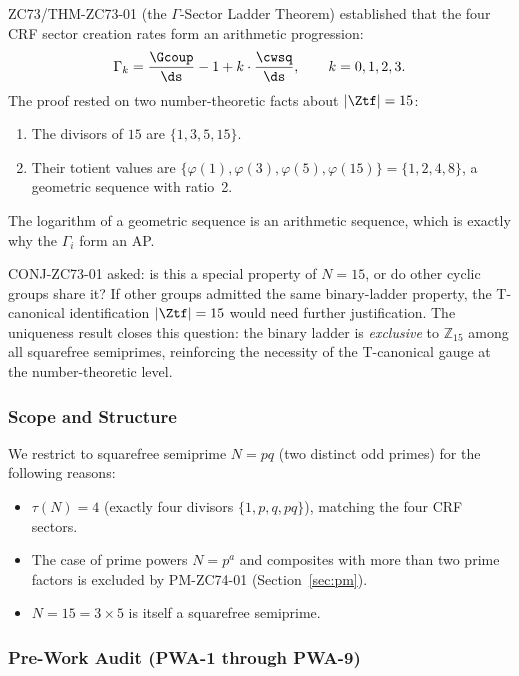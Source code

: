 \documentclass[12pt, a4paper]{article}
\begin{document}
\begin{keybox}[title={What CONJ-ZC73-01 Requires and Why It Matters}]
ZC73/THM-ZC73-01 (the $\Gamma$-Sector Ladder Theorem) established that
the four CRF sector creation rates form an arithmetic progression:
\[
  \Gamma_k = \frac{\Gcoup}{\ds} - 1 + k\cdot\frac{\cwsq}{\ds},
  \qquad k = 0, 1, 2, 3.
\]
The proof rested on two number-theoretic facts about $|\Ztf| = 15$:
\begin{enumerate}[leftmargin=2em, noitemsep]
  \item The divisors of $15$ are $\{1, 3, 5, 15\}$.
  \item Their totient values are $\{\varphi(1), \varphi(3), \varphi(5),
    \varphi(15)\} = \{1, 2, 4, 8\}$, a geometric sequence with ratio~2.
\end{enumerate}
The logarithm of a geometric sequence is an arithmetic sequence,
which is exactly why the $\Gamma_i$ form an AP.

CONJ-ZC73-01 asked: is this a special property of $N = 15$, or do
other cyclic groups share it? If other groups admitted the same
binary-ladder property, the T-canonical identification
$|\Ztf| = 15$ would need further justification. The uniqueness
result closes this question: the binary ladder is \emph{exclusive}
to $\mathbb{Z}_{15}$ among all squarefree semiprimes, reinforcing
the necessity of the T-canonical gauge at the number-theoretic level.
\end{keybox}

\subsubsection{Scope and Structure}

We restrict to squarefree semiprime $N = pq$ (two distinct odd primes)
for the following reasons:
\begin{itemize}[leftmargin=2em, noitemsep]
  \item $\tau(N) = 4$ (exactly four divisors $\{1, p, q, pq\}$),
    matching the four CRF sectors.
  \item The case of prime powers $N = p^a$ and composites with more
    than two prime factors is excluded by PM-ZC74-01
    (Section~\ref{sec:pm}).
  \item $N = 15 = 3 \times 5$ is itself a squarefree semiprime.
\end{itemize}

\subsubsection{Pre-Work Audit (PWA-1 through PWA-9)}
\end{document}
